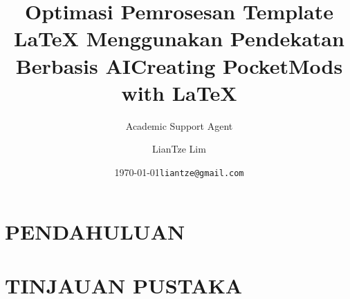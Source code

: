 \documentclass{scrartcl}
\title{Optimasi Pemrosesan Template LaTeX Menggunakan Pendekatan Berbasis AI}
\author{Academic Support Agent}
\date{\today}
\begin{document}
\maketitle

\begin{abstract}

\end{abstract}

\chapter{PENDAHULUAN}


\chapter{TINJAUAN PUSTAKA}




\usepackage[margin=0.75in,includefoot,bottom=0.3in,footskip=2em]{geometry}

\usepackage[T1]{fontenc}
\usepackage[lining,tabular]{fbb}
\usepackage[scaled=.95,type1]{cabin}
\usepackage[varqu,varl]{zi4}
\usepackage[libertine,bigdelims]{newtxmath}

\usepackage[showmarks]{pocketmod}

\usepackage{graphicx}
\usepackage{enumitem}
\usepackage[hyphens]{url}

\title{Creating PocketMods with \LaTeX}
\author{LianTze Lim}
\date{\texttt{liantze@gmail.com}}

\setcounter{secnumdepth}{0}
\end{document}
